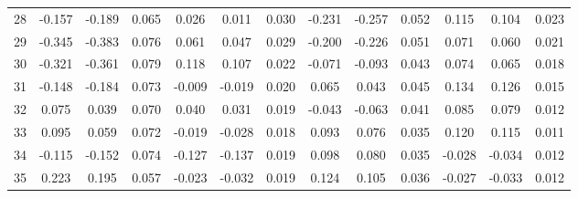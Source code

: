 \begin{footnotesize}
\begin{longtable}{lcccccccccccc}
28 & -0.157 & -0.189 & 0.065 & 0.026 & 0.011 & 0.030 & -0.231 & -0.257 & 0.052 & 0.115 & 0.104 & 0.023 \\
29 & -0.345 & -0.383 & 0.076 & 0.061 & 0.047 & 0.029 & -0.200 & -0.226 & 0.051 & 0.071 & 0.060 & 0.021 \\
30 & -0.321 & -0.361 & 0.079 & 0.118 & 0.107 & 0.022 & -0.071 & -0.093 & 0.043 & 0.074 & 0.065 & 0.018 \\
31 & -0.148 & -0.184 & 0.073 & -0.009 & -0.019 & 0.020 & 0.065 & 0.043 & 0.045 & 0.134 & 0.126 & 0.015 \\
32 & 0.075 & 0.039 & 0.070 & 0.040 & 0.031 & 0.019 & -0.043 & -0.063 & 0.041 & 0.085 & 0.079 & 0.012 \\
33 & 0.095 & 0.059 & 0.072 & -0.019 & -0.028 & 0.018 & 0.093 & 0.076 & 0.035 & 0.120 & 0.115 & 0.011 \\
34 & -0.115 & -0.152 & 0.074 & -0.127 & -0.137 & 0.019 & 0.098 & 0.080 & 0.035 & -0.028 & -0.034 & 0.012 \\
35 & 0.223 & 0.195 & 0.057 & -0.023 & -0.032 & 0.019 & 0.124 & 0.105 & 0.036 & -0.027 & -0.033 & 0.012 \\
\end{longtable}
\end{footnotesize}

